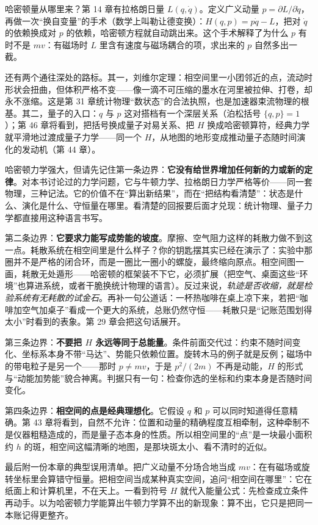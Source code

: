 \begin{challenge}
哈密顿量从哪里来？第 14 章有拉格朗日量 \(L(q,\dot{q})\)。定义广义动量 \(p=\partial L/\partial\dot{q}\)，再做一次“换自变量”的手术（数学上叫勒让德变换）：\(H(q,p)=p\dot{q}-L\)，把对 \(\dot{q}\) 的依赖换成对 \(p\) 的依赖，哈密顿方程就自动跳出来。这个手术解释了为什么 \(p\) 有时不是 \(mv\)：有磁场时 \(L\) 里含有速度与磁场耦合的项，求出来的 \(p\) 自然多出一截。

还有两个通往深处的路标。其一，刘维尔定理：相空间里一小团邻近的点，流动时形状会扭曲，但体积严格不变——像一滴不可压缩的墨水在河里被拉伸、打卷，却永不涨缩。这是第 31 章统计物理“数状态”的合法执照，也是加速器束流物理的根基。其二，量子的入口：\(q\) 与 \(p\) 这对搭档有一个深层关系（泊松括号 \(\{q,p\}=1\)）；第 46 章将看到，把括号换成量子对易关系、把 \(H\) 换成哈密顿算符，经典力学就平滑地过渡成量子力学——同一个 \(H\)，从地图的地形变成推动量子态随时间演化的发动机（第 44 章）。
\end{challenge}


\begin{mainline}
哈密顿力学强大，但请先记住第一条边界：\textbf{它没有给世界增加任何新的力或新的定律}。对本书讨论过的力学问题，它与牛顿力学、拉格朗日力学严格等价——同一套物理，三种记法。它的价值不在“算出新结果”，而在“把结构看清楚”：状态是什么、演化是什么、守恒量在哪里。看清楚的回报要后面才兑现：统计物理、量子力学都直接用这种语言书写。

第二条边界：\textbf{它要求力能写成势能的坡度}。摩擦、空气阻力这样的耗散力做不到这一点。耗散系统在相空间里是什么样子？你的钥匙摆其实已经在演示了：实验中那圈并不是严格的闭合环，而是一圈比一圈小的螺旋，最终缩向原点。相空间图一画，耗散无处遁形——哈密顿的框架装不下它，必须扩展（把空气、桌面这些“环境”也算进系统，或者干脆换统计物理的语言）。反过来说，\emph{轨迹是否收缩，就是检验系统有无耗散的试金石}。再补一句公道话：一杯热咖啡在桌上凉下来，若把“咖啡加空气加桌子”看成一个更大的系统，总账仍然守恒——耗散只是“记账范围划得太小”时看到的表象。第 29 章会把这句话展开。

第三条边界：\textbf{不要把 \(H\) 永远等同于总能量}。条件前面交代过：约束不随时间变化、坐标系本身不带“马达”、势能只依赖位置。旋转木马的例子就是反例；磁场中的带电粒子是另一个——那时 \(p\neq mv\)，于是 \(p^{2}/(2m)\) 不再是动能，\(H\) 的形式与“动能加势能”貌合神离。判据只有一句：检查你选的坐标和约束本身是否随时间变化。

第四条边界：\textbf{相空间的点是经典理想化}。它假设 \(q\) 和 \(p\) 可以同时知道得任意精确。第 43 章将看到，自然不允许：位置和动量的精确程度互相牵制，这种牵制不是仪器粗糙造成的，而是量子态本身的性质。所以相空间里的“点”是一块最小面积约 \(h\) 的斑，相空间这幅清晰的地图，是那块斑太小、看不清时的近似。

最后附一份本章的典型误用清单。把广义动量不分场合地当成 \(mv\)：在有磁场或旋转坐标里会算错守恒量。把相空间当成某种真实空间，追问“相空间在哪里”：它在纸面上和计算机里，不在天上。一看到符号 \(H\) 就代入能量公式：先检查成立条件再动手。以为哈密顿力学能算出牛顿力学算不出的新现象：算不出，它只是把同一本账记得更整齐。
\end{mainline}

